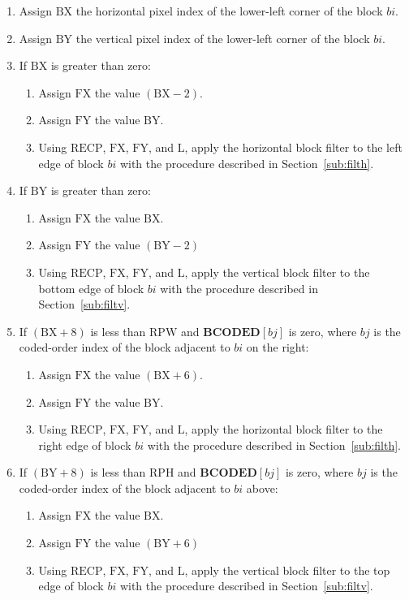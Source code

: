 \documentclass[9pt,letterpaper]{book}
\newcommand{\idx}[1]{{\ensuremath{\mathit{#1}}}}
\newcommand{\bi}{\idx{bi}}
\newcommand{\bj}{\idx{bj}}
\newcommand{\bitvar}[1]{\ensuremath{\mathbf{\bm{#1}}}}
\newcommand{\locvar}[1]{\ensuremath{\mathrm{#1}}}
\numberwithin{equation}{chapter}
\numberwithin{figure}{chapter}
\numberwithin{table}{chapter}
\begin{document}
\begin{enumerate}
\begin{enumerate}
\begin{enumerate}
\item
Assign \locvar{BX} the horizontal pixel index of the lower-left corner of the
 block \locvar{\bi}.
\item
Assign \locvar{BY} the vertical pixel index of the lower-left corner of the
 block \locvar{\bi}.
\item
If \locvar{BX} is greater than zero:
\begin{enumerate}
\item
Assign \locvar{FX} the value $(\locvar{BX}-2)$.
\item
Assign \locvar{FY} the value \locvar{BY}.
\item
Using \locvar{RECP}, \locvar{FX}, \locvar{FY}, and \locvar{L}, apply the
 horizontal block filter to the left edge of block \locvar{\bi} with the
 procedure described in Section~\ref{sub:filth}.
\end{enumerate}
\item
If \locvar{BY} is greater than zero:
\begin{enumerate}
\item
Assign \locvar{FX} the value \locvar{BX}.
\item
Assign \locvar{FY} the value $(\locvar{BY}-2)$
\item
Using \locvar{RECP}, \locvar{FX}, \locvar{FY}, and \locvar{L}, apply the
 vertical block filter to the bottom edge of block \locvar{\bi} with the
 procedure described in Section~\ref{sub:filtv}.
\end{enumerate}
\item
If $(\locvar{BX}+8)$ is less than \locvar{RPW} and
 $\bitvar{BCODED}[\locvar{\bj}]$ is zero, where \locvar{\bj} is the coded-order
 index of the block adjacent to \locvar{\bi} on the right:
\begin{enumerate}
\item
Assign \locvar{FX} the value $(\locvar{BX}+6)$.
\item
Assign \locvar{FY} the value \locvar{BY}.
\item
Using \locvar{RECP}, \locvar{FX}, \locvar{FY}, and \locvar{L}, apply the
 horizontal block filter to the right edge of block \locvar{\bi} with the
 procedure described in Section~\ref{sub:filth}.
\end{enumerate}
\item
If $(\locvar{BY}+8)$ is less than \locvar{RPH} and
 $\bitvar{BCODED}[\locvar{\bj}]$ is zero, where \locvar{\bj} is the coded-order
 index of the block adjacent to \locvar{\bi} above:
\begin{enumerate}
\item
Assign \locvar{FX} the value \locvar{BX}.
\item
Assign \locvar{FY} the value $(\locvar{BY}+6)$
\item
Using \locvar{RECP}, \locvar{FX}, \locvar{FY}, and \locvar{L}, apply the
 vertical block filter to the top edge of block \locvar{\bi} with the
 procedure described in Section~\ref{sub:filtv}.
\end{enumerate}
\end{enumerate}
\end{enumerate}
\end{enumerate}
\end{document}
